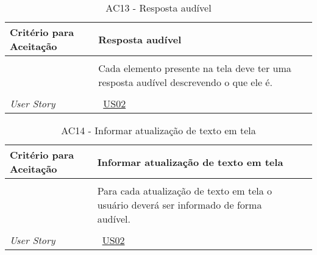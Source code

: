 \begin{apendicesenv}
\begin{table}[ht]
\begin{center}
\begin{tabularx}{\textwidth}{|lX|l|}
\end{tabularx}
\end{center}
\label{tab:us01a12}
\end{table}


\begin{table}[ht]
\centering
\caption{AC13 - Resposta audível}
\vspace{0.1cm}
\begin{center}
\begin{tabularx}{\textwidth}{|lX|l|}

\hline
\textbf{Critério para Aceitação} & Resposta audível \\
\hline
 & \\
 & Cada elemento presente na tela deve ter uma resposta audível descrevendo o que ele é. \\
 & \\
\hline
\textit{User Story} & ~\hyperref[tab:us02]{US02} \\
\hline

\end{tabularx}
\end{center}
\label{tab:us01a13}
\end{table}


\begin{table}[ht]
\centering
\caption{AC14 - Informar atualização de texto em tela}
\vspace{0.1cm}
\begin{center}
\begin{tabularx}{\textwidth}{|lX|l|}

\hline
\textbf{Critério para Aceitação} & Informar atualização de texto em tela \\
\hline
 & \\
 & Para cada atualização de texto em tela o usuário deverá ser informado de forma audível. \\
 & \\
\hline
\textit{User Story} & ~\hyperref[tab:us02]{US02} \\
\hline


\end{tabularx}
\end{center}
\end{table}
\end{apendicesenv}
